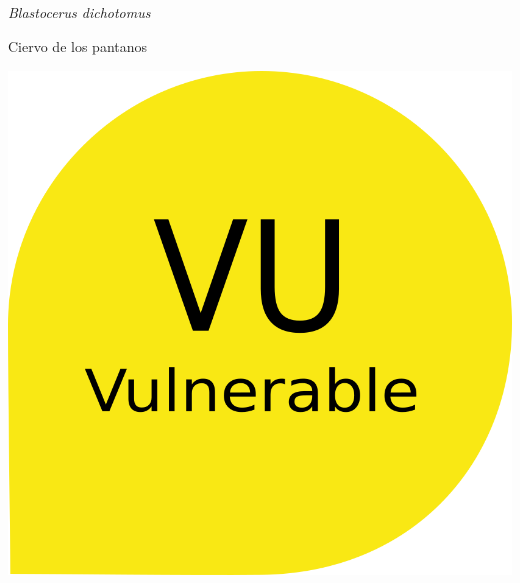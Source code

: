 \documentclass[
  x11names]{article}
\title{~}
\author{}
\date{\vspace{-2.5em}}
\begin{document}
\maketitle

\renewenvironment{framed}[1][\hsize]
  {\MakeFramed{\hsize#1\advance\hsize-\width \FrameRestore}}%
  {\endMakeFramed}

\setmainfont{Arial}
\setsansfont{Arial}
\setmonofont{Arial}

\newcommand\invisiblesection[1]{%
  \refstepcounter{section}%
  \addcontentsline{toc}{section}{\protect\numberline{\thesection}#1}%
  \sectionmark{#1}}


%

\vspace{-3cm}

\begin{minipage}{0.7\textwidth}
\vspace{0.15cm}
{\fontsize{18}{22}\selectfont\textit{Blastocerus dichotomus}}

\vspace{0.3cm}
{\fontsize{30}{36}\selectfont Ciervo de los pantanos}
\end{minipage}
\hspace{0.05\textwidth}
\begin{minipage}{0.20\textwidth}
\includegraphics[width=\textwidth]{images/vu.png}\\
\end{minipage}
\end{document}
